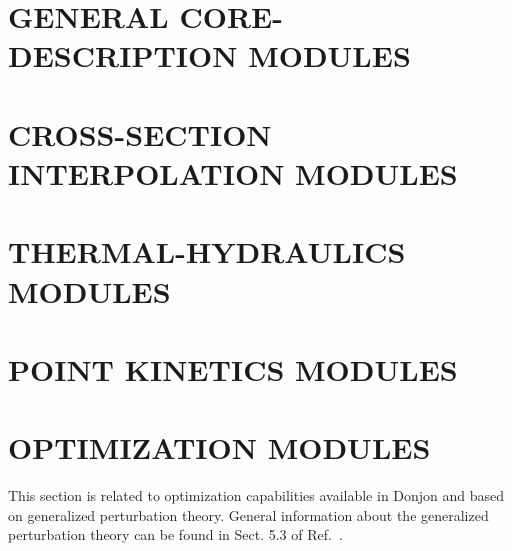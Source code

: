\section{GENERAL CORE-DESCRIPTION MODULES}\label{sect:modesc1}


\vskip 1.0cm

\vskip 1.0cm

\vskip 1.0cm

\vskip 1.0cm

\vskip 1.0cm

\vskip 1.0cm

\vskip 1.0cm

\vskip 1.0cm

\vskip 1.0cm

\vskip 1.0cm

\vskip 1.0cm

\vskip 1.0cm

\vskip 1.0cm

\vskip 1.0cm

\vskip 1.0cm

\vskip 1.0cm

\vskip 1.0cm

\vskip 1.0cm

\vskip 1.0cm


\section{CROSS-SECTION INTERPOLATION MODULES}\label{sect:modesc2}


\vskip 1.0cm

\vskip 1.0cm

\vskip 1.0cm

\vskip 1.0cm

\vskip 1.0cm

\vskip 1.0cm

\vskip 1.0cm

\vskip 1.0cm

\vskip 1.0cm

\section{THERMAL-HYDRAULICS MODULES}\label{sect:modesc3}



\section{POINT KINETICS MODULES}\label{sect:modesc4}




\section{OPTIMIZATION MODULES}\label{sect:modesc5}

This section is related to optimization capabilities available in Donjon and
based on generalized perturbation theory.\cite{optex1,optex2} General information
about the generalized perturbation theory can be found in Sect. 5.3 of Ref.~.

